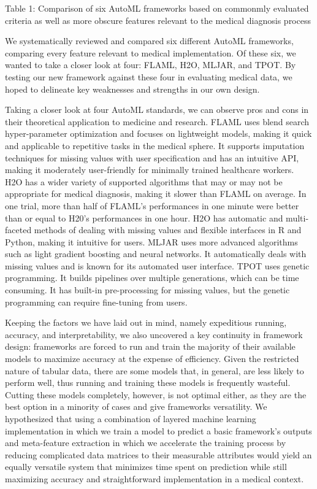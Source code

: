 \documentclass{article}
\begin{document}
Table 1: Comparison of six AutoML frameworks based on commonmly evaluated criteria as well as more obscure features relevant to the medical diagnosis process 

We systematically reviewed and compared six different AutoML frameworks, comparing every feature relevant to medical implementation. Of these six, we wanted to take a closer look at four: FLAML, H2O, MLJAR, and TPOT. By testing our new framework against these four in evaluating medical data, we hoped to delineate key weaknesses and strengths in our own design. 

Taking a closer look at four AutoML standards, we can observe pros and cons in their theoretical application to medicine and research. FLAML uses blend search hyper-parameter optimization and focuses on lightweight models, making it quick and applicable to repetitive tasks in the medical sphere. It supports imputation techniques for missing values with user specification and has an intuitive API, making it moderately user-friendly for minimally trained healthcare workers. H2O has a wider variety of supported algorithms that may or may not be appropriate for medical diagnosis, making it slower than FLAML on average. In one trial, more than half of FLAML's performances in one minute were better than or equal to H20's performances in one hour. H2O has automatic and multi-faceted methods of dealing with missing values and flexible interfaces in R and Python, making it intuitive for users. MLJAR uses more advanced algorithms such as light gradient boosting and neural networks. It automatically deals with missing values and is known for its automated user interface. TPOT uses genetic programming. It builds pipelines over multiple generations, which can be time consuming. It has built-in pre-processing for missing values, but the genetic programming can require fine-tuning from users. 

Keeping the factors we have laid out in mind, namely expeditious running, accuracy, and interpretability, we also uncovered a key continuity in framework design: frameworks are forced to run and train the majority of their available models to maximize accuracy at the expense of efficiency. Given the restricted nature of tabular data, there are some models that, in general, are less likely to perform well, thus running and training these models is frequently wasteful. Cutting these models completely, however, is not optimal either, as they are the best option in a minority of cases and give frameworks versatility. We hypothesized that using a combination of layered machine learning implementation in which we train a model to predict a basic framework's outputs and meta-feature extraction in which we accelerate the training process by reducing complicated data matrices to their measurable attributes would yield an equally versatile system that minimizes time spent on prediction while still maximizing accuracy and straightforward implementation in a medical context. 
\end{document}
